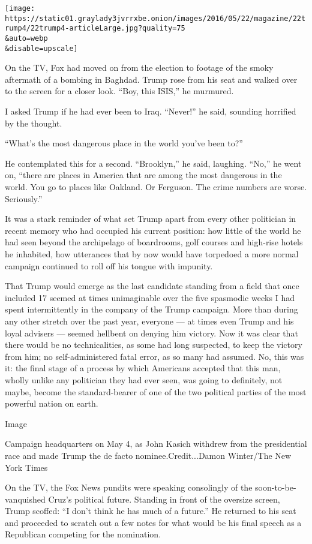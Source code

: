 \texttt{[image: https://static01.graylady3jvrrxbe.onion/images/2016/05/22/magazine/22trump4/22trump4-articleLarge.jpg?quality=75\\\&auto=webp\\\&disable=upscale]}

On the TV, Fox had moved on from the election to footage of the smoky
aftermath of a bombing in Baghdad. Trump rose from his seat and walked
over to the screen for a closer look. ``Boy, this ISIS,'' he murmured.

I asked Trump if he had ever been to Iraq. ``Never!'' he said, sounding
horrified by the thought.

``What's the most dangerous place in the world you've been to?''

He contemplated this for a second. ``Brooklyn,'' he said, laughing.
``No,'' he went on, ``there are places in America that are among the
most dangerous in the world. You go to places like Oakland. Or Ferguson.
The crime numbers are worse. Seriously.''

It was a stark reminder of what set Trump apart from every other
politician in recent memory who had occupied his current position: how
little of the world he had seen beyond the archipelago of boardrooms,
golf courses and high-rise hotels he inhabited, how utterances that by
now would have torpedoed a more normal campaign continued to roll off
his tongue with impunity.

That Trump would emerge as the last candidate standing from a field that
once included 17 seemed at times unimaginable over the five spasmodic
weeks I had spent intermittently in the company of the Trump campaign.
More than during any other stretch over the past year, everyone --- at
times even Trump and his loyal advisers --- seemed hellbent on denying
him victory. Now it was clear that there would be no technicalities, as
some had long suspected, to keep the victory from him; no
self-administered fatal error, as so many had assumed. No, this was it:
the final stage of a process by which Americans accepted that this man,
wholly unlike any politician they had ever seen, was going to
definitely, not maybe, become the standard-bearer of one of the two
political parties of the most powerful nation on earth.

Image

Campaign headquarters on May 4, as John Kasich withdrew from the
presidential race and made Trump the de facto nominee.Credit...Damon
Winter/The New York Times

On the TV, the Fox News pundits were speaking consolingly of the
soon-to-be-vanquished Cruz's political future. Standing in front of the
oversize screen, Trump scoffed: ``I don't think he has much of a
future.'' He returned to his seat and proceeded to scratch out a few
notes for what would be his final speech as a Republican competing for
the nomination.

